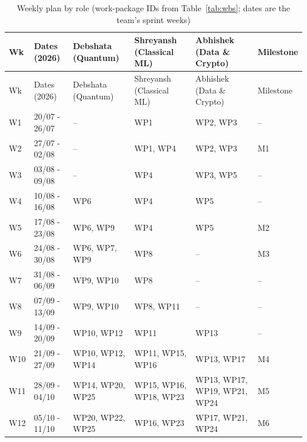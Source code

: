 \begin{longtable}{@{}p{0.8cm}p{2.1cm}p{3.4cm}p{3.0cm}p{3.0cm}p{1.2cm}@{}}
\caption{Weekly plan by role (work-package IDs from Table~\ref{tab:wbs}; dates are the team's sprint weeks)}\label{tab:weekly}\\
\toprule Wk & Dates (2026) & Debshata (Quantum) & Shreyansh (Classical ML) & Abhishek (Data \& Crypto) & Milestone\\ \midrule \endfirsthead
\toprule Wk & Dates (2026) & Debshata (Quantum) & Shreyansh (Classical ML) & Abhishek (Data \& Crypto) & Milestone\\ \midrule \endhead
W1 & 20/07 - 26/07 & -- & WP1 & WP2, WP3 & --\\
W2 & 27/07 - 02/08 & -- & WP1, WP4 & WP2, WP3 & M1\\
W3 & 03/08 - 09/08 & -- & WP4 & WP3, WP5 & --\\
W4 & 10/08 - 16/08 & WP6 & WP4 & WP5 & --\\
W5 & 17/08 - 23/08 & WP6, WP9 & WP4 & WP5 & M2\\
W6 & 24/08 - 30/08 & WP6, WP7, WP9 & WP8 & -- & M3\\
W7 & 31/08 - 06/09 & WP9, WP10 & WP8 & -- & --\\
W8 & 07/09 - 13/09 & WP9, WP10 & WP8, WP11 & -- & --\\
W9 & 14/09 - 20/09 & WP10, WP12 & WP11 & WP13 & --\\
W10 & 21/09 - 27/09 & WP10, WP12, WP14 & WP11, WP15, WP16 & WP13, WP17 & M4\\
W11 & 28/09 - 04/10 & WP14, WP20, WP25 & WP15, WP16, WP18, WP23 & WP13, WP17, WP19, WP21, WP24 & M5\\
W12 & 05/10 - 11/10 & WP20, WP22, WP25 & WP16, WP23 & WP17, WP21, WP24 & M6\\
\bottomrule
\end{longtable}
